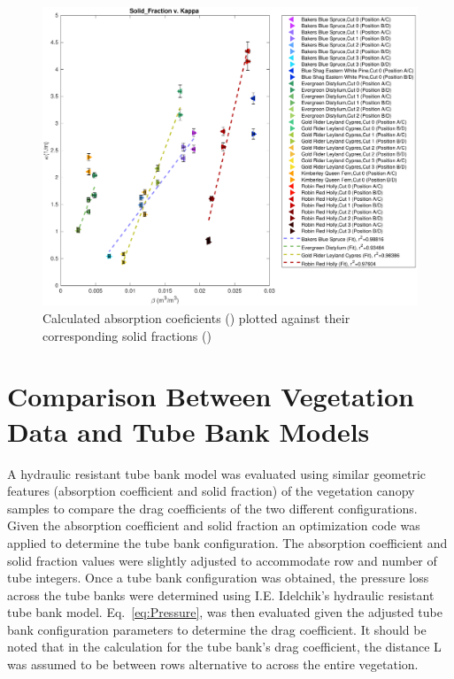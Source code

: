 \documentclass[12pt]{article}
\begin{document}
\begin{figure}[h]
	\centering 	\includegraphics[width=0.8\linewidth]{Solid_FractionvKappa(Ave).pdf}
	\caption{Calculated absorption coeficients (\textkappa) plotted against their corresponding solid fractions (\textbeta) }
	\label{fig:betavkappa}
\end{figure}
\pagebreak

\section{Comparison Between Vegetation Data and Tube Bank Models}
\label{sec:comp}

A hydraulic resistant tube bank model was evaluated using similar geometric features (absorption coefficient and solid fraction) of the vegetation canopy samples to compare the drag coefficients of the two different configurations. Given the absorption coefficient and solid fraction an optimization code was applied to determine the tube bank configuration. The absorption coefficient and solid fraction values were slightly adjusted to accommodate row and number of tube integers. Once a tube bank configuration was obtained, the pressure loss across the tube banks were determined using I.E. Idelchik's hydraulic resistant tube bank model.  Eq.~\ref{eq:Pressure}, was then evaluated given the adjusted tube bank configuration parameters to determine the drag coefficient. It should be noted that in the calculation for the tube bank's drag coefficient, the distance L was assumed to be between rows alternative to across the entire vegetation.\\
\end{document}
